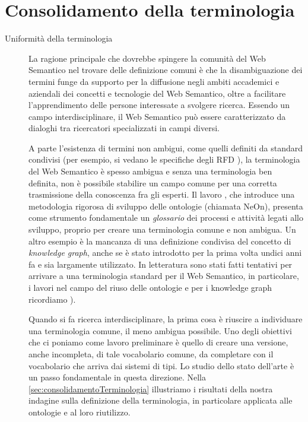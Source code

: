 \section{Consolidamento della terminologia}
\label{sec:consolidamentoTerminologia}
\begin{description}
	\item[Uniformità della terminologia] La ragione principale che dovrebbe spingere la comunità del Web Semantico nel trovare delle definizione comuni è che la disambiguazione dei termini funge da supporto per la diffusione negli ambiti accademici e aziendali dei concetti e tecnologie del Web Semantico, oltre a facilitare l'apprendimento delle persone interessate a svolgere ricerca. Essendo un campo interdisciplinare, il Web Semantico può essere caratterizzato da dialoghi tra ricercatori specializzati in campi diversi.
	
	A parte l'esistenza di termini non ambigui, come quelli definiti da standard condivisi (per esempio, si vedano le specifiche degli RFD \cite{RDFspecification}), la terminologia del Web Semantico è spesso ambigua e senza una terminologia ben definita, non è possibile stabilire un campo comune per una corretta trasmissione della conoscenza fra gli esperti. Il lavoro \cite{NeOn}, che introduce una metodologia rigorosa di sviluppo delle ontologie (chiamata NeOn), presenta come strumento fondamentale un \emph{glossario} dei processi e attività legati allo sviluppo, proprio per creare una terminologia comune e non ambigua.  Un altro esempio è la mancanza di una definizione condivisa del concetto di \textit{knowledge graph}, anche se è stato introdotto per la prima volta undici anni fa e sia largamente utilizzato. In letteratura sono stati fatti tentativi per arrivare a una terminologia standard per il Web Semantico, in particolare, i lavori \cite{katsumi2018ontology, goy2015ontologies, NeOn} nel campo del riuso delle ontologie e per i knowledge graph ricordiamo \cite{ehrlinger2016towards}). 
	
	Quando si fa ricerca interdisciplinare, la prima cosa è riuscire a individuare una terminologia comune, il meno ambigua possibile. Uno degli obiettivi che ci poniamo come lavoro preliminare è quello di creare una versione, anche incompleta, di tale vocabolario comune, da completare con il vocabolario che arriva dai sistemi di tipi. Lo studio dello stato dell'arte è un passo fondamentale in questa direzione. Nella \autoref{sec:consolidamentoTerminologia} illustriamo i risultati della nostra indagine sulla definizione della terminologia, in particolare applicata alle ontologie e al loro riutilizzo.
	

\end{description}
